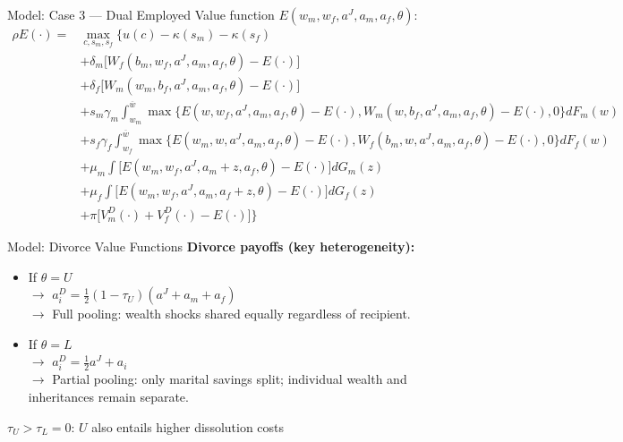 \documentclass[aspectratio=169, 11pt]{beamer}
\newcommand{\B}[1]{\textcolor{dutch}{\textbf{#1}}}
\begin{document}
\begin{frame}{Model: Case 3 — Dual Employed}
\small
Value function $E(w_m, w_f, a^J, a_m, a_f, \theta)$:
\begin{align*}
\rho E(\cdot)=& \max_{c,s_m,s_f} \bigg\{u(c)-\kappa(s_m)-\kappa(s_f) \\
&+\delta_m\big[W_f(b_m,w_f,a^J,a_m,a_f,\theta)-E(\cdot)\big]\\&+\delta_f\big[W_m(w_m,b_f,a^J,a_m,a_f,\theta)-E(\cdot)\big]\\
&+s_m\gamma_m\int_{w_m}^{\overline{w}}\max\big\{E(w,w_f,a^J,a_m,a_f,\theta)-E(\cdot),W_m(w,b_f,a^J,a_m,a_f,\theta)-E(\cdot),0\big\}dF_m(w)\\
&+s_f\gamma_f\int_{w_f}^{\overline{w}}\max\big\{E(w_m,w,a^J,a_m,a_f,\theta)-E(\cdot),W_f(b_m,w,a^J,a_m,a_f,\theta)-E(\cdot),0\big\}dF_f(w)\\
&+\mu_m\int\big[E(w_m,w_f,a^J,a_m+z,a_f,\theta)-E(\cdot)\big]dG_m(z)\\&+\mu_f\int\big[E(w_m,w_f,a^J,a_m,a_f+z,\theta)-E(\cdot)\big]dG_f(z)\\
&+\pi\big[V_m^D(\cdot)+V_f^D(\cdot)-E(\cdot)]\bigg\}
\end{align*}
\end{frame}



\begin{frame}{Model: Divorce Value Functions}
\textbf{Divorce payoffs (key heterogeneity):} \\
\vspace{0.6em}
\begin{itemize}
\item If $\theta = U$ \\
$\to$ $a^D_i = \tfrac{1}{2}(1-\tau_U)(a^J + a_m + a_f)$\\[0.3em]
$\to$ Full pooling: wealth shocks shared equally regardless of recipient.\\
\vspace{1.6em}
\item If $\theta = L$ \\
$\to$ $a^D_i = \tfrac{1}{2}a^J + a_i$\\[0.3em]
$\to$ Partial pooling: only marital savings split; individual wealth and inheritances remain separate. \\
\end{itemize}
\vspace{1.6em}
$\tau_U > \tau_L = 0$: $U$ also entails higher dissolution costs
\end{frame}
\end{document}
